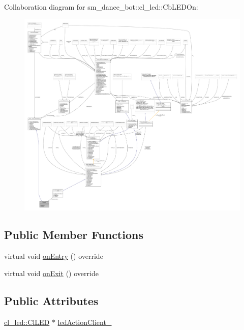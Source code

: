 Collaboration diagram for sm\+\_\+dance\+\_\+bot\+:\+:cl\+\_\+led\+:\+:Cb\+L\+E\+D\+On\+:
\nopagebreak
\begin{figure}[H]
\begin{center}
\leavevmode
\includegraphics[width=350pt]{classsm__dance__bot_1_1cl__led_1_1CbLEDOn__coll__graph}
\end{center}
\end{figure}
\subsection*{Public Member Functions}
\begin{DoxyCompactItemize}
\item 
virtual void \hyperlink{classsm__dance__bot_1_1cl__led_1_1CbLEDOn_a3b7de8585d728becefb8c2c5cc3b6d95}{on\+Entry} () override
\item 
virtual void \hyperlink{classsm__dance__bot_1_1cl__led_1_1CbLEDOn_a60a82058c585b4d0398b531c1e1bdf0b}{on\+Exit} () override
\end{DoxyCompactItemize}
\subsection*{Public Attributes}
\begin{DoxyCompactItemize}
\item 
\hyperlink{classsm__dance__bot_1_1cl__led_1_1ClLED}{cl\+\_\+led\+::\+Cl\+L\+ED} $\ast$ \hyperlink{classsm__dance__bot_1_1cl__led_1_1CbLEDOn_a1ee516ed1a051922f804818ea429f2fe}{led\+Action\+Client\+\_\+}
\end{DoxyCompactItemize}


